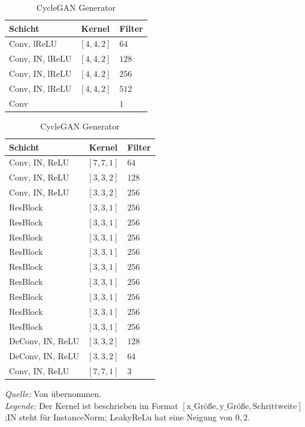  \begin{table}[]
 	\caption{CycleGAN Architektur}
 	\label{tab:cycleGAN}
 	\begin{center}
 		\begin{minipage}{.5\linewidth}
 			\caption{CycleGAN Discriminator}
 			\centering
 			\begin{tabular}{lcl}
 				\toprule
 				Schicht & Kernel & Filter\\
 				\toprule
 				Conv, lReLU & $[4,4,2]$ & $64$\\
 				\midrule
 				Conv, IN, lReLU & $[4,4,2]$ & $128$\\
 				\midrule
 				Conv, IN, lReLU & $[4,4,2]$ & $256$\\
 				\midrule
 				Conv, IN, lReLU & $[4,4,2]$ & $512$\\
 				\midrule
 				Conv & &$1$\\
 				\bottomrule
 			\end{tabular}
 		\end{minipage}%
 		\begin{minipage}{.5\linewidth}
 			\centering
 			\caption{CycleGAN Generator}
 			\begin{tabular}{lcl}
 				\toprule
 				Schicht & Kernel & Filter\\
 				\toprule
 				Conv, IN, ReLU & $[7,7,1]$ & $64$\\
 				\midrule
 				Conv, IN, ReLU & $[3,3,2]$ & $128$\\
 				\midrule
 				Conv, IN, ReLU & $[3,3,2]$ & $256$\\
 				\midrule
 				ResBlock & $[3,3,1]$& $256$ \\
 				\midrule
 				ResBlock & $[3,3,1]$& $256$ \\
 				\midrule
 				ResBlock & $[3,3,1]$& $256$ \\
 				\midrule
 				ResBlock & $[3,3,1]$& $256$ \\
 				\midrule
 				ResBlock & $[3,3,1]$& $256$ \\
 				\midrule
 				ResBlock & $[3,3,1]$& $256$ \\
 				\midrule
 				ResBlock & $[3,3,1]$& $256$ \\
 				\midrule
 				ResBlock & $[3,3,1]$& $256$ \\
 				\midrule
 				ResBlock & $[3,3,1]$& $256$ \\
 				\midrule
 				DeConv, IN, ReLU & $[3,3,2]$ & $128$\\
 				\midrule
 				DeConv, IN, ReLU & $[3,3,2]$ & $64$\\
 				\midrule
 				Conv, IN, ReLU & $[7,7,1]$ & $3$\\
 				\bottomrule
 			\end{tabular}
 		\end{minipage} 
 	\end{center}
 	\begin{center}
 		\bigskip
 		\emph{Quelle:} Von \cite{zhu2017unpaired} übernommen.\\
 		\emph{Legende:} Der Kernel ist beschrieben im Format $[\text{x\_Größe},
 		\text{y\_Größe}, \text{Schrittweite}]$;IN steht für InstanceNorm; LeakyReLu hat eine Neigung von $0,2$.
 	\end{center}
 \end{table}
 
